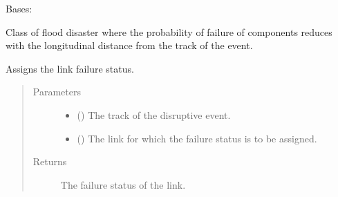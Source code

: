 \documentclass[letterpaper,10pt,english]{sphinxmanual}
\begin{document}
\begin{fulllineitems}
\label{\detokenize{apidoc:dreaminsg_integrated_model.src.hazard_initiator.TrackDisruption}}
\sphinxAtStartPar
Bases: 

\sphinxAtStartPar
Class of flood disaster where the probability of failure of components reduces with the longitudinal distance from the track of the event.

\begin{fulllineitems}
\label{\detokenize{apidoc:dreaminsg_integrated_model.src.hazard_initiator.TrackDisruption.assign_link_failure}}
\sphinxAtStartPar
Assigns the link failure status.
\begin{quote}\begin{description}
\item[{Parameters}] \leavevmode\begin{itemize}
\item {} 
\sphinxAtStartPar
{} () \textendash{} The track of the disruptive event.

\item {} 
\sphinxAtStartPar
{} () \textendash{} The link for which the failure status is to be assigned.

\end{itemize}

\item[{Returns}] \leavevmode
\sphinxAtStartPar
The failure status of the link.


\end{description}
\end{quote}
\end{fulllineitems}
\end{fulllineitems}
\end{document}
